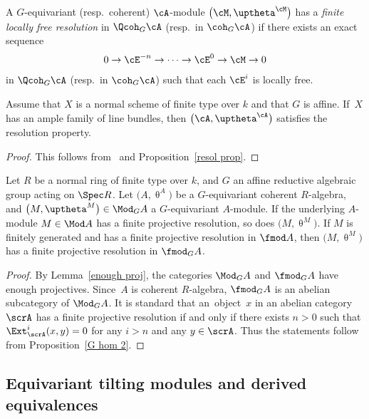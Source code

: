 \begin{dfn}
A $G$-equivariant (resp.\ coherent) $\cA$-module $\big(\cM,\uptheta^{\cM}\big)$ has a {\it finite locally free resolution} in $\Qcoh_G\cA$ (resp.\ in $\coh_G\cA$) if there exists an exact sequence
\begin{gather*}
0\to \cE^{-n}\to\cdots\to\cE^0\to \cM\to0
\end{gather*}
in $\Qcoh_G\cA$ (resp.\ in $\coh_G\cA$) such that each $\cE^i$ is locally free.
\end{dfn}


\begin{lem}\label{enough proj}
Assume that $X$ is a normal scheme of finite type over $k$ and that $G$ is affine.
If~$X$ has an ample family of line bundles, then $\big(\cA,\uptheta^{\cA}\big)$ satisfies the resolution property.
\begin{proof}
This follows from~\cite[Theorem~2.29]{bfk} and Proposition~\ref{resol prop}.
\end{proof}
\end{lem}

\begin{lem}\label{finite proj resol}
Let $R$ be a normal ring of finite type over $k$, and $G$ an affine reductive algebraic group acting on $\Spec R$. Let $\big(A,\uptheta^{A}\big)$ be a $G$-equivariant coherent $R$-algebra, and $\big(M,\uptheta^M\big)\in \Mod_GA$ a $G$-equivariant $A$-module. If the underlying $A$-module $M\in \Mod A$ has a finite projective resolution, so does $\big(M,\uptheta^M\big)$. If $M$ is finitely generated and has a finite projective resolution in $\fmod A$, then $\big(M,\uptheta^M\big)$ has a finite projective resolution in $\fmod_GA$.
\begin{proof}
By Lemma~\ref{enough proj}, the categories $\Mod_GA$ and $\fmod_GA$ have enough projectives. Since~$A$ is coherent $R$-algebra, $\fmod_GA$ is an abelian subcategory of $\Mod_GA$. It is standard that an~object~$x$ in an abelian category $\scrA$ has a finite projective resolution if and only if there exists $n>0$ such that $\Ext_{\scrA}^i(x,y)=0$ for any $i>n$ and any $y\in \scrA$. Thus the statements follow from Proposition~\ref{G hom 2}.
\end{proof}
\end{lem}

\subsection{Equivariant tilting modules and derived equivalences}\label{derived section}

